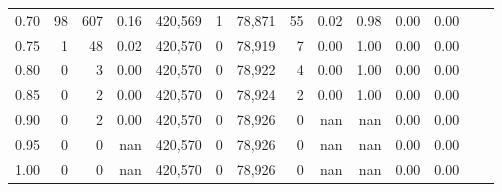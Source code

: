 \begin{tabular}{rrrrrrrrrrrrrr}
0.70 &       98 &     607 &    0.16 &  420,569 &        1 &  78,871 &      55 &  0.02 &  0.98 &  0.00 &      0.00 \\
0.75 &        1 &      48 &    0.02 &  420,570 &        0 &  78,919 &       7 &  0.00 &  1.00 &  0.00 &      0.00 \\
0.80 &        0 &       3 &    0.00 &  420,570 &        0 &  78,922 &       4 &  0.00 &  1.00 &  0.00 &      0.00 \\
0.85 &        0 &       2 &    0.00 &  420,570 &        0 &  78,924 &       2 &  0.00 &  1.00 &  0.00 &      0.00 \\
0.90 &        0 &       2 &    0.00 &  420,570 &        0 &  78,926 &       0 &   nan &   nan &  0.00 &      0.00 \\
0.95 &        0 &       0 &     nan &  420,570 &        0 &  78,926 &       0 &   nan &   nan &  0.00 &      0.00 \\
1.00 &        0 &       0 &     nan &  420,570 &        0 &  78,926 &       0 &   nan &   nan &  0.00 &      0.00 \\
\bottomrule
\end{tabular}
